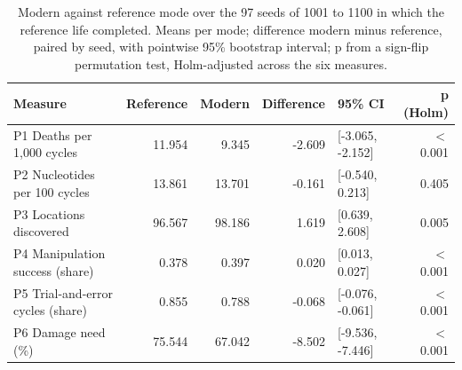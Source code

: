 \begin{table}[t]
\centering
\caption{Modern against reference mode over the 97 seeds of 1001 to 1100 in which the reference life completed. Means per mode; difference modern minus reference, paired by seed, with pointwise 95\% bootstrap interval; p from a sign-flip permutation test, Holm-adjusted across the six measures.}
\label{tab:T3}
\begin{tabular}{lrrrlr}
\toprule
Measure & Reference & Modern & Difference & 95\% CI & p (Holm) \\
\midrule
P1 Deaths per 1,000 cycles & 11.954 & 9.345 & -2.609 & [-3.065, -2.152] & $<$ 0.001 \\
P2 Nucleotides per 100 cycles & 13.861 & 13.701 & -0.161 & [-0.540, 0.213] & 0.405 \\
P3 Locations discovered & 96.567 & 98.186 & 1.619 & [0.639, 2.608] & 0.005 \\
P4 Manipulation success (share) & 0.378 & 0.397 & 0.020 & [0.013, 0.027] & $<$ 0.001 \\
P5 Trial-and-error cycles (share) & 0.855 & 0.788 & -0.068 & [-0.076, -0.061] & $<$ 0.001 \\
P6 Damage need (\%) & 75.544 & 67.042 & -8.502 & [-9.536, -7.446] & $<$ 0.001 \\
\bottomrule
\end{tabular}
\end{table}

